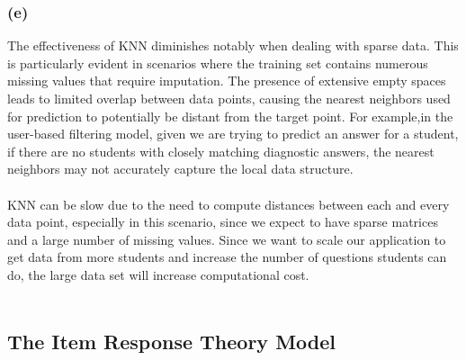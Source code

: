 \documentclass{article}
\begin{document}
\subsubsection{(e)}
The effectiveness of KNN diminishes notably when dealing with sparse data. This is particularly evident in scenarios where the training set contains numerous missing values that require imputation. The presence of extensive empty spaces leads to limited overlap between data points, causing the nearest neighbors used for prediction to potentially be distant from the target point. For example,in the user-based filtering model, given we are trying to predict an answer for a student, if there are no students with closely matching diagnostic answers, the nearest neighbors may not accurately capture the local data structure.\\
\\
KNN can be slow due to the need to compute distances between each and every data point, especially in this scenario, since we expect to have sparse matrices and a large number of missing values. Since we want to scale our application to get data from more students and increase the number of questions students can do, the large data set will increase computational cost. \\
\\
\newpage

\subsection{The Item Response Theory Model}
\end{document}

